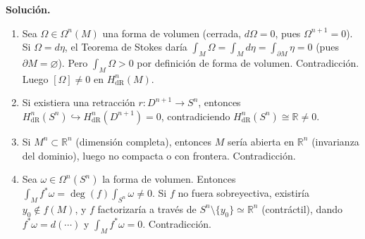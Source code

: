 \documentclass[11pt,a4paper]{article}
\theoremstyle{plain}
\theoremstyle{definition}
\theoremstyle{remark}
\newcommand{\RR}{\mathbb R}
\begin{document}
\begin{enumerate}[label=\arabic*.,leftmargin=*]
\noindent\textbf{Solución.}
\begin{enumerate}[label=\alph*)]
\item Sea $\Omega\in\Omega^n(M)$ una forma de volumen (cerrada, $d\Omega=0$,
pues $\Omega^{n+1}=0$). Si $\Omega=d\eta$, el Teorema de Stokes daría
$\int_M\Omega=\int_Md\eta=\int_{\partial M}\eta=0$ (pues $\partial M=\varnothing$).
Pero $\int_M\Omega>0$ por definición de forma de volumen. Contradicción.
Luego $[\Omega]\ne0$ en $H^n_{\mathrm{dR}}(M)$.
\item Si existiera una retracción $r:D^{n+1}\to S^n$, entonces
$H^n_{\mathrm{dR}}(S^n)\hookrightarrow H^n_{\mathrm{dR}}(D^{n+1})=0$,
contradiciendo $H^n_{\mathrm{dR}}(S^n)\cong\RR\ne0$.
\item Si $M^n\subset\RR^n$ (dimensión completa), entonces $M$ sería abierta
en $\RR^n$ (invarianza del dominio), luego no compacta o con frontera.
Contradicción.
\item Sea $\omega\in\Omega^n(S^n)$ la forma de volumen. Entonces
$\int_Mf^*\omega=\deg(f)\int_{S^n}\omega\ne0$. Si $f$ no fuera
sobreyectiva, existiría $y_0\notin f(M)$, y $f$ factorizaría a través de
$S^n\setminus\{y_0\}\simeq\RR^n$ (contráctil), dando $f^*\omega=d(\cdots)$
y $\int_Mf^*\omega=0$. Contradicción.
\end{enumerate}

\end{enumerate}
\end{document}
